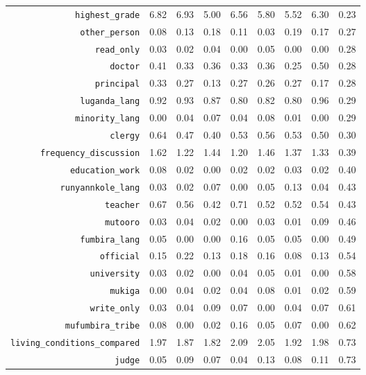 \begin{longtable}{rrrrrrrrr}
  {\texttt{highest\_grade}} & 6.82 & 6.93 & 5.00 & 6.56 & 5.80 & 5.52 & 6.30 & 0.23 \\ 
  {\texttt{other\_person}} & 0.08 & 0.13 & 0.18 & 0.11 & 0.03 & 0.19 & 0.17 & 0.27 \\ 
  {\texttt{read\_only}} & 0.03 & 0.02 & 0.04 & 0.00 & 0.05 & 0.00 & 0.00 & 0.28 \\ 
  {\texttt{doctor}} & 0.41 & 0.33 & 0.36 & 0.33 & 0.36 & 0.25 & 0.50 & 0.28 \\ 
  {\texttt{principal}} & 0.33 & 0.27 & 0.13 & 0.27 & 0.26 & 0.27 & 0.17 & 0.28 \\ 
  {\texttt{luganda\_lang}} & 0.92 & 0.93 & 0.87 & 0.80 & 0.82 & 0.80 & 0.96 & 0.29 \\ 
  {\texttt{minority\_lang}} & 0.00 & 0.04 & 0.07 & 0.04 & 0.08 & 0.01 & 0.00 & 0.29 \\ 
  {\texttt{clergy}} & 0.64 & 0.47 & 0.40 & 0.53 & 0.56 & 0.53 & 0.50 & 0.30 \\ 
  {\texttt{frequency\_discussion}} & 1.62 & 1.22 & 1.44 & 1.20 & 1.46 & 1.37 & 1.33 & 0.39 \\ 
  {\texttt{education\_work}} & 0.08 & 0.02 & 0.00 & 0.02 & 0.02 & 0.03 & 0.02 & 0.40 \\ 
  {\texttt{runyannkole\_lang}} & 0.03 & 0.02 & 0.07 & 0.00 & 0.05 & 0.13 & 0.04 & 0.43 \\ 
  {\texttt{teacher}} & 0.67 & 0.56 & 0.42 & 0.71 & 0.52 & 0.52 & 0.54 & 0.43 \\ 
  {\texttt{mutooro}} & 0.03 & 0.04 & 0.02 & 0.00 & 0.03 & 0.01 & 0.09 & 0.46 \\ 
  {\texttt{fumbira\_lang}} & 0.05 & 0.00 & 0.00 & 0.16 & 0.05 & 0.05 & 0.00 & 0.49 \\ 
  {\texttt{official}} & 0.15 & 0.22 & 0.13 & 0.18 & 0.16 & 0.08 & 0.13 & 0.54 \\ 
  {\texttt{university}} & 0.03 & 0.02 & 0.00 & 0.04 & 0.05 & 0.01 & 0.00 & 0.58 \\ 
  {\texttt{mukiga}} & 0.00 & 0.04 & 0.02 & 0.04 & 0.08 & 0.01 & 0.02 & 0.59 \\ 
  {\texttt{write\_only}} & 0.03 & 0.04 & 0.09 & 0.07 & 0.00 & 0.04 & 0.07 & 0.61 \\ 
  {\texttt{mufumbira\_tribe}} & 0.08 & 0.00 & 0.02 & 0.16 & 0.05 & 0.07 & 0.00 & 0.62 \\ 
  {\texttt{living\_conditions\_compared}} & 1.97 & 1.87 & 1.82 & 2.09 & 2.05 & 1.92 & 1.98 & 0.73 \\ 
  {\texttt{judge}} & 0.05 & 0.09 & 0.07 & 0.04 & 0.13 & 0.08 & 0.11 & 0.73 \\ 

\end{longtable}
